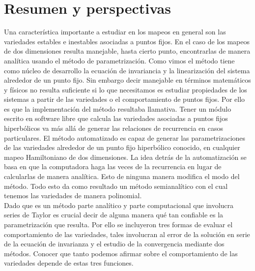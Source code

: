
\chapter{Resumen y perspectivas}
Una característica importante a estudiar en los mapeos en general son las variedades estables e inestables asociadas a puntos fijos. En el caso de los mapeos de dos dimensiones resulta manejable, hasta cierto punto, encontrarlas de manera analítica usando el método de parametrización. Como vimos el método tiene como núcleo de desarrollo la ecuación de invariancia y la linearización del sistema alrededor de un punto fijo. Sin embargo decir manejable en términos matemáticos y físicos no resulta suficiente si lo que necesitamos es estudiar propiedades de los sistemas a partir de las variedades o el comportamiento de puntos fijos. Por ello es que la implementación del método resultaba llamativa. Tener un módulo escrito en software libre que calcula las variedades asociadas a puntos fijos hiperbólicos va más allá de generar las relaciones de recurrencia en casos particulares. El método automatizado es capaz de generar las parametrizaciones de las variedades alrededor de un punto fijo hiperbólico conocido, en cualquier mapeo Hamiltoniano de dos dimensiones. La idea detrás de la automatización se basa en que la computadora haga las veces de la recurrencia en lugar de calcularlas de manera analítica. Esto de ninguna manera modifica el modo del método. Todo esto da como resultado un método semianalítico con el cual tenemos las variedades de manera polinomial. \\

Dado que es un método parte analítico y parte computacional que involucra series de Taylor es crucial decir de alguna manera qué tan confiable es la parametrización que resulta. Por ello se incluyeron tres formas de evaluar el comportamiento de las variedades, tales involucran al error de la solución en serie de la ecuación de invarianza y el estudio de la convergencia mediante dos métodos. Conocer que tanto podemos afirmar sobre el comportamiento de las variedades depende de estas tres funciones.\\

